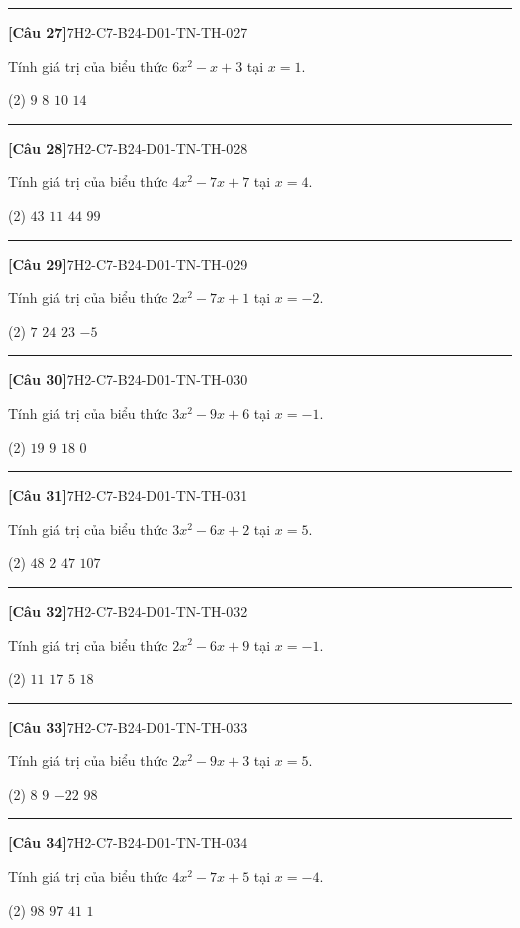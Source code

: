 \documentclass[12pt,a4paper]{article}
\newif\ifloigiai
\newenvironment{cauhoi}[2]{%
  \par\medskip\noindent\rule{\textwidth}{0.4pt}\par\nopagebreak
  \noindent\textbf{[#1]}\hfill{\scriptsize\ttfamily #2}\par\nopagebreak\smallskip}{\par}
\newcommand{\dapan}[1]{\ifloigiai\par\smallskip\noindent\textit{Đáp án:} \textbf{#1}\par\fi}
\begin{document}
\begin{cauhoi}{Câu 27}{7H2-C7-B24-D01-TN-TH-027}
Tính giá trị của biểu thức $6x^{2}-x+3$ tại $x=1$.
\begin{tasks}(2)
\task $9$
\task $8$
\task $10$
\task $14$
\end{tasks}
\dapan{B}
\end{cauhoi}
\begin{cauhoi}{Câu 28}{7H2-C7-B24-D01-TN-TH-028}
Tính giá trị của biểu thức $4x^{2}-7x+7$ tại $x=4$.
\begin{tasks}(2)
\task $43$
\task $11$
\task $44$
\task $99$
\end{tasks}
\dapan{A}
\end{cauhoi}
\begin{cauhoi}{Câu 29}{7H2-C7-B24-D01-TN-TH-029}
Tính giá trị của biểu thức $2x^{2}-7x+1$ tại $x=-2$.
\begin{tasks}(2)
\task $7$
\task $24$
\task $23$
\task $-5$
\end{tasks}
\dapan{C}
\end{cauhoi}
\begin{cauhoi}{Câu 30}{7H2-C7-B24-D01-TN-TH-030}
Tính giá trị của biểu thức $3x^{2}-9x+6$ tại $x=-1$.
\begin{tasks}(2)
\task $19$
\task $9$
\task $18$
\task $0$
\end{tasks}
\dapan{C}
\end{cauhoi}
\begin{cauhoi}{Câu 31}{7H2-C7-B24-D01-TN-TH-031}
Tính giá trị của biểu thức $3x^{2}-6x+2$ tại $x=5$.
\begin{tasks}(2)
\task $48$
\task $2$
\task $47$
\task $107$
\end{tasks}
\dapan{C}
\end{cauhoi}
\begin{cauhoi}{Câu 32}{7H2-C7-B24-D01-TN-TH-032}
Tính giá trị của biểu thức $2x^{2}-6x+9$ tại $x=-1$.
\begin{tasks}(2)
\task $11$
\task $17$
\task $5$
\task $18$
\end{tasks}
\dapan{B}
\end{cauhoi}
\begin{cauhoi}{Câu 33}{7H2-C7-B24-D01-TN-TH-033}
Tính giá trị của biểu thức $2x^{2}-9x+3$ tại $x=5$.
\begin{tasks}(2)
\task $8$
\task $9$
\task $-22$
\task $98$
\end{tasks}
\dapan{A}
\end{cauhoi}
\begin{cauhoi}{Câu 34}{7H2-C7-B24-D01-TN-TH-034}
Tính giá trị của biểu thức $4x^{2}-7x+5$ tại $x=-4$.
\begin{tasks}(2)
\task $98$
\task $97$
\task $41$
\task $1$
\end{tasks}
\dapan{B}
\end{cauhoi}
\end{document}

